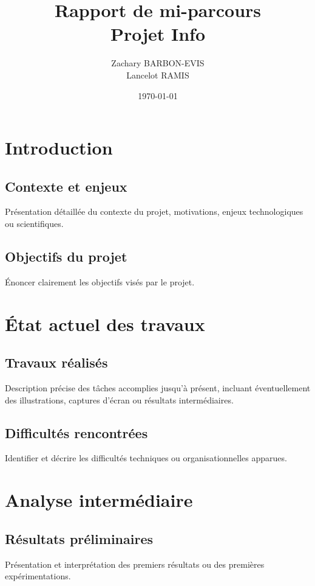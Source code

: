 \documentclass[a4paper,12pt]{report}
\title{Rapport de mi-parcours \\ \textbf{Projet Info}}
\author{Zachary BARBON-EVIS \\ Lancelot RAMIS \\}
\date{\today}
\begin{document}
\maketitle

\tableofcontents
\newpage

\chapter{Introduction}

\section{Contexte et enjeux}
Présentation détaillée du contexte du projet, motivations, enjeux technologiques ou scientifiques.

\section{Objectifs du projet}
Énoncer clairement les objectifs visés par le projet.

\chapter{État actuel des travaux}

\section{Travaux réalisés}
Description précise des tâches accomplies jusqu’à présent, incluant éventuellement des illustrations,
captures d'écran ou résultats intermédiaires.

\section{Difficultés rencontrées}
Identifier et décrire les difficultés techniques ou organisationnelles apparues.

\chapter{Analyse intermédiaire}

\section{Résultats préliminaires}
Présentation et interprétation des premiers résultats ou des premières expérimentations.
\end{document}
